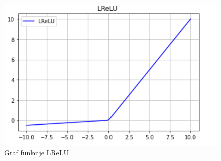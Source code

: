 \documentclass[times, utf8, zavrsni, numeric]{fer}
\begin{document}
\begin{figure}[htb]
\centering
\includegraphics[scale=0.6]{img/slika9.png}
\caption{Graf funkcije LReLU}
\label{fig:Perceptron}
\end{figure}
\end{document}
